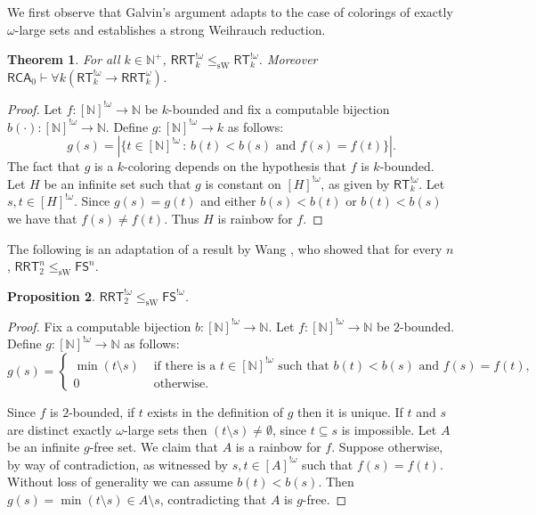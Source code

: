 \documentclass[10pt,a4paper]{article}
\newcommand{\RCA}[0]{\mathsf{RCA}}
\newcommand{\RRT}[0]{\mathsf{RRT}}
\newcommand{\FS}[0]{\mathsf{FS}}
\newcommand{\RT}[0]{\mathsf{RT}}
\newcommand{\NN}[0]{\mathbb{N}}
\newcommand{\sW}{\mathrm{sW}}
\newtheorem{theorem}{Theorem}
\numberwithin{theorem}{section}
\newtheorem{proposition}[theorem]{Proposition}
\begin{document}
We first observe that Galvin's argument adapts to the case of colorings of exactly $\omega$-large sets and establishes a strong Weihrauch reduction.

\begin{theorem}\label{thm:largerrt}
For all $k\in\NN^+$, $\RRT^{!\omega}_k \leq_\sW \RT^{!\omega}_k$. Moreover $\RCA_0 \vdash \forall k (\RT^{!\omega}_k\to \RRT^{\omega}_k)$.
\end{theorem}

\begin{proof}
Let $f:[\NN]^{!\omega} \to \NN$ be $k$-bounded and fix a computable bijection $b(\cdot): [\NN]^{!\omega} \to \NN$.
Define $g:[\NN]^{!\omega} \to k$ as follows:
$$ g(s) = |\{ t \in [\NN]^{!\omega} \,:\, b(t) < b(s) \text{ and } f(s) = f(t)\}|.$$
The fact that $g$ is a $k$-coloring depends on the hypothesis that $f$ is $k$-bounded.
Let $H$ be an infinite set such that $g$ is constant on $[H]^{!\omega}$, as given by $\RT^{!\omega}_k$. 
Let $s, t \in [H]^{!\omega}$. Since $g(s) = g(t)$ and either $b(s) < b(t)$ or $b(t) < b(s)$
we have that $f(s) \neq f(t)$. Thus $H$ is rainbow for $f$. 
\end{proof}

The following is an adaptation of a result by Wang \cite{wang2014some}, who showed that for every $n$, $\RRT^n_2 \leq_\sW \FS^n$.

\begin{proposition}\label{prop:rrt-omega-2-sw-fs-omega}
$\RRT^{!\omega}_2 \leq_\sW \FS^{!\omega}$.
\end{proposition}

\begin{proof}
Fix a computable bijection $b: [\NN]^{!\omega} \to \NN$. Let $f:[\NN]^{!\omega}\to\NN$
be $2$-bounded. Define $g:[\NN]^{!\omega} \to \NN$ as follows:
$$
g(s)=
\begin{cases}
\min(t\setminus s) & \mbox{ if there is a } t\in [\NN]^{!\omega} \text{ such that } b(t)<b(s) \text{ and } f(s)=f(t),\\
0 & \mbox{ otherwise.}
\end{cases}
$$

Since $f$ is $2$-bounded, if $t$ exists in the definition of $g$ then it is unique. If $t$ and $s$ are distinct
exactly $\omega$-large sets then $(t\setminus s)\neq \emptyset$, since $t\subseteq s$ is impossible. Let $A$ be 
an infinite $g$-free set. We claim that $A$ is a rainbow for $f$. Suppose otherwise, by way of contradiction, 
as witnessed by $s, t \in [A]^{!\omega}$ such that $f(s) = f(t)$. Without loss of generality we can assume
$b(t) < b(s)$. Then $g(s) = \min(t\setminus s) \in A \setminus s$, contradicting that $A$ is $g$-free.
\end{proof}
\end{document}
